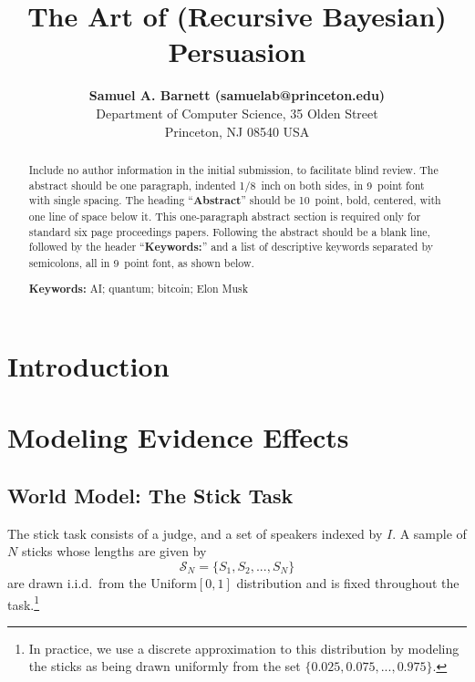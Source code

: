 \documentclass[10pt,letterpaper]{article}
\title{The Art of (Recursive Bayesian) Persuasion}
\author{{\large \bf Samuel A. Barnett (samuelab@princeton.edu)} \\
  Department of Computer Science, 35 Olden Street \\
  Princeton, NJ 08540 USA}
\begin{document}
\maketitle


\begin{abstract}
Include no author information in the initial submission, to facilitate
blind review.  The abstract should be one paragraph, indented 1/8~inch on both sides,
in 9~point font with single spacing. The heading ``{\bf Abstract}''
should be 10~point, bold, centered, with one line of space below
it. This one-paragraph abstract section is required only for standard
six page proceedings papers. Following the abstract should be a blank
line, followed by the header ``{\bf Keywords:}'' and a list of
descriptive keywords separated by semicolons, all in 9~point font, as
shown below.

\textbf{Keywords:} 
AI; quantum; bitcoin; Elon Musk
\end{abstract}

\section{Introduction}





\section{Modeling Evidence Effects}
\subsection{World Model: The Stick Task}
The stick task consists of a judge, and a set of speakers indexed by $I$. 
A sample of $N$ sticks whose lengths are given by
\begin{equation}
\mathcal{S}_N = \{ S_1, S_2, ..., S_N \}
\end{equation}
are drawn i.i.d.\ from the Uniform$[0,1]$ distribution and is fixed throughout
the task.\footnote{In practice, we use a discrete approximation to this distribution 
by modeling the sticks as being drawn uniformly from the set $\{ 0.025, 0.075, ..., 0.975\}$.} 
\end{document}

